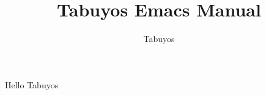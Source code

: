 \documentclass[10pt]{ctexart}
\begin{document}
\title{Tabuyos Emacs Manual}
\author{Tabuyos}
\maketitle
Hello Tabuyos
\end{document}
